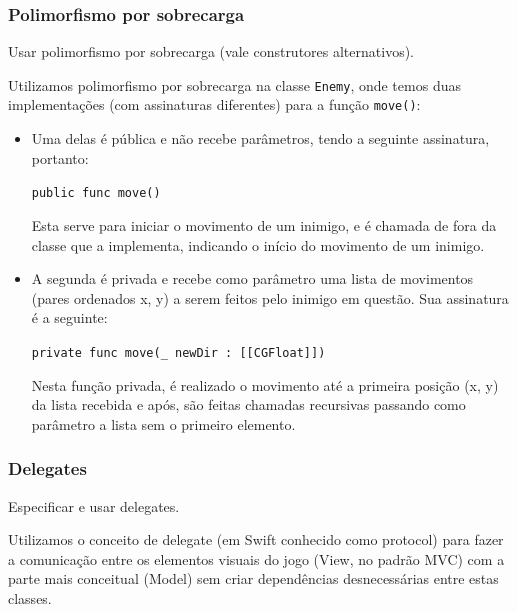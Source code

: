 \documentclass[rel_mlp]{iiufrgs}
\begin{document}
\subsubsection{Polimorfismo por sobrecarga}

Usar polimorfismo por sobrecarga (vale construtores alternativos).

Utilizamos polimorfismo por sobrecarga na classe \texttt{Enemy}, onde temos duas implementações (com assinaturas diferentes) para a função \texttt{move()}:

\begin{itemize}
\setlength{\itemindent}{1em}
    \item Uma delas é pública e não recebe parâmetros, tendo a seguinte assinatura, portanto:
    
    \texttt{public func move()}
    
    Esta serve para iniciar o movimento de um inimigo, e é chamada de fora da classe que a implementa, indicando o início do movimento de um inimigo.
    
    \item A segunda é privada e recebe como parâmetro uma lista de movimentos (pares ordenados x, y) a serem feitos pelo inimigo em questão. Sua assinatura é a seguinte:
    
    \texttt{private func move(\_ newDir : [[CGFloat]])}
    
    Nesta função privada, é realizado o movimento até a primeira posição (x, y) da lista recebida e após, são feitas chamadas recursivas passando como parâmetro a lista sem o primeiro elemento.
\end{itemize}




\subsubsection{Delegates}

Especificar e usar delegates.

Utilizamos o conceito de delegate (em Swift conhecido como protocol) para fazer a comunicação entre os elementos visuais do jogo (View, no padrão MVC) com a parte mais conceitual (Model) sem criar dependências desnecessárias entre estas classes.
\end{document}
